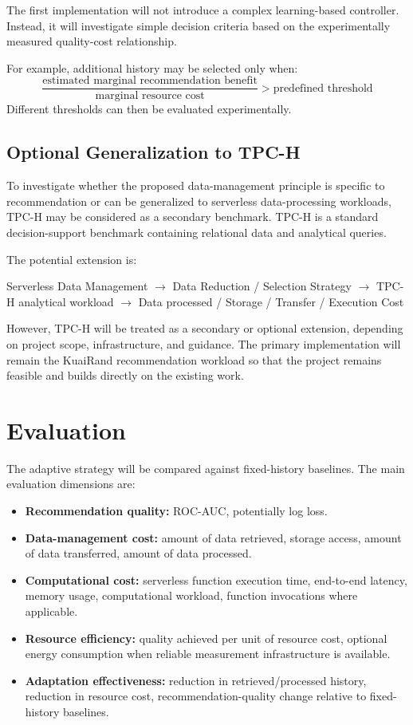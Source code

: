 \documentclass[12pt,a4paper]{article}
\begin{document}
The first implementation will not introduce a complex learning-based controller. Instead, it will investigate simple decision criteria based on the experimentally measured quality-cost relationship.

For example, additional history may be selected only when:
\[ \frac{\text{estimated marginal recommendation benefit}}{\text{marginal resource cost}} > \text{predefined threshold} \]
Different thresholds can then be evaluated experimentally.

\subsection{Optional Generalization to TPC-H}
To investigate whether the proposed data-management principle is specific to recommendation or can be generalized to serverless data-processing workloads, TPC-H may be considered as a secondary benchmark. TPC-H is a standard decision-support benchmark containing relational data and analytical queries.

The potential extension is:
\begin{center}
Serverless Data Management $\rightarrow$ Data Reduction / Selection Strategy $\rightarrow$ TPC-H analytical workload $\rightarrow$ Data processed / Storage / Transfer / Execution Cost
\end{center}

However, TPC-H will be treated as a secondary or optional extension, depending on project scope, infrastructure, and guidance. The primary implementation will remain the KuaiRand recommendation workload so that the project remains feasible and builds directly on the existing work.

\section{Evaluation}

The adaptive strategy will be compared against fixed-history baselines. The main evaluation dimensions are:

\begin{itemize}
    \item \textbf{Recommendation quality:} ROC-AUC, potentially log loss.
    \item \textbf{Data-management cost:} amount of data retrieved, storage access, amount of data transferred, amount of data processed.
    \item \textbf{Computational cost:} serverless function execution time, end-to-end latency, memory usage, computational workload, function invocations where applicable.
    \item \textbf{Resource efficiency:} quality achieved per unit of resource cost, optional energy consumption when reliable measurement infrastructure is available.
    \item \textbf{Adaptation effectiveness:} reduction in retrieved/processed history, reduction in resource cost, recommendation-quality change relative to fixed-history baselines.
\end{itemize}
\end{document}
